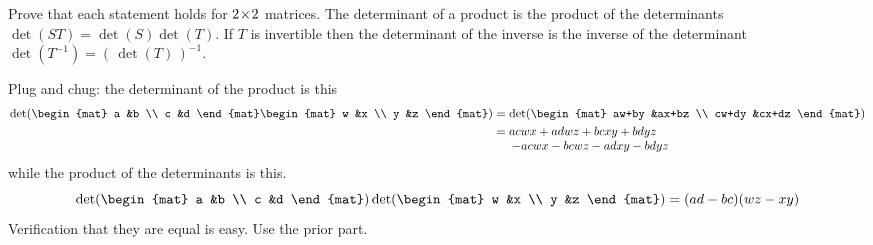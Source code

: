 
\begin{Exercise}[
name={},
title={}, 
difficulty=0,
origin={\cite{JH}}]
Prove that each statement holds for $2 \! \times \! 2$ matrices.  
\Question The determinant of a
        product is the product of the determinants
        $\det(ST)=\det(S)\det(T)$.
\Question If \( T \) is invertible then
        the determinant of the inverse is the inverse of the determinant
        \( \det(T^{-1})=(\,\det(T)\,)^{-1} \).

\end{Exercise}

\begin{Answer}
\Question Plug and chug:
          the determinant of the product is this
          \begin{align*}
             \det(\begin{mat}
                       a  &b  \\
                       c  &d
                    \end{mat}
                    \begin{mat}
                       w  &x  \\
                       y  &z
                    \end{mat}  )
             &=
             \det(\begin{mat}
                 aw+by  &ax+bz  \\
                 cw+dy  &cx+dz
              \end{mat} )                 \\
             &=
             \begin{array}[t]{@{}l@{}} 
                 acwx+adwz+bcxy+bdyz  \\
                 \> -acwx-bcwz-adxy-bdyz
              \end{array}
          \end{align*}
          while the product of the determinants is this.
          \begin{equation*}
             \det(\begin{mat}
                a  &b  \\
                c  &d
             \end{mat})
             \det(\begin{mat}
                w  &x  \\
                y  &z
             \end{mat})
             =
             (ad-bc)(wz-xy)
          \end{equation*}
          Verification that they are equal is easy.
\Question Use the prior part.

\end{Answer}
